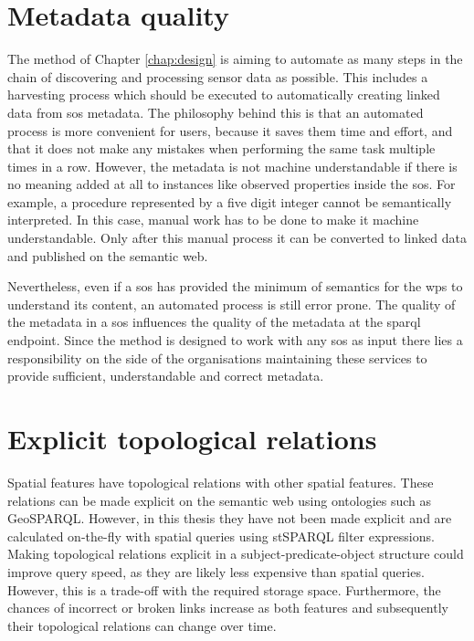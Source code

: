 \section*{Metadata quality}
The method of Chapter \ref{chap:design} is aiming to automate as many steps in the chain of discovering and processing sensor data as possible. This includes a harvesting process which should be executed to automatically creating linked data from \ac{sos} metadata. The philosophy behind this is that an automated process is more convenient for users, because it saves them time and effort, and that it does not make any mistakes when performing the same task multiple times in a row. However, the metadata is not machine understandable if there is no meaning added at all to instances like observed properties inside the \ac{sos}. For example, a procedure represented by a five digit integer cannot be semantically interpreted. In this case, manual work has to be done to make it machine understandable. Only after this manual process it can be converted to linked data and published on the semantic web. 

Nevertheless, even if a \ac{sos} has provided the minimum of semantics for the \ac{wps} to understand its content, an automated process is still error prone. The quality of the metadata in a \ac{sos} influences the quality of the metadata at the \ac{sparql} endpoint. Since the method is designed to work with any \ac{sos} as input there lies a responsibility on the side of the organisations maintaining these services to provide sufficient, understandable and correct metadata.   

 

\section*{Explicit topological relations}
Spatial features have topological relations with other spatial features. These relations can be made explicit on the semantic web using ontologies such as GeoSPARQL. However, in this thesis they have not been made explicit and are calculated on-the-fly with spatial queries using stSPARQL filter expressions. Making topological relations explicit in a subject-predicate-object structure could improve query speed, as they are likely less expensive than spatial queries. However, this is a trade-off with the required storage space. Furthermore, the chances of incorrect or broken links increase as both features and subsequently their topological relations can change over time. 

